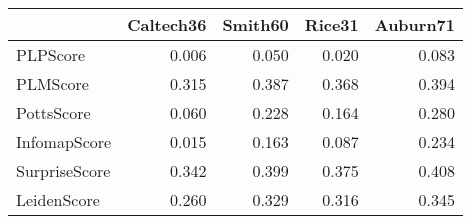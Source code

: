 \begin{tabular}{lrrrr}
\toprule
{} & Caltech36 & Smith60 & Rice31 & Auburn71 \\
\midrule
PLPScore      &     0.006 &   0.050 &  0.020 &    0.083 \\
PLMScore      &     0.315 &   0.387 &  0.368 &    0.394 \\
PottsScore    &     0.060 &   0.228 &  0.164 &    0.280 \\
InfomapScore  &     0.015 &   0.163 &  0.087 &    0.234 \\
SurpriseScore &     0.342 &   0.399 &  0.375 &    0.408 \\
LeidenScore   &     0.260 &   0.329 &  0.316 &    0.345 \\
\bottomrule
\end{tabular}
